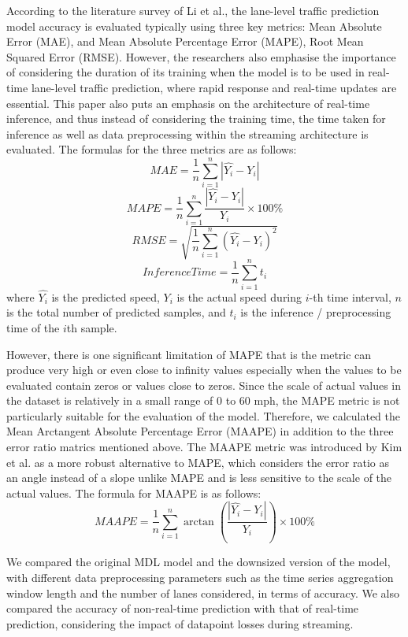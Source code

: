 \documentclass[11pt]{uonthesis}
\begin{document}
According to the literature survey of Li et al.\cite{li2024unifyinglaneleveltrafficprediction}, the lane-level traffic prediction model accuracy is evaluated typically using three key metrics: Mean Absolute Error (MAE), and Mean Absolute Percentage Error (MAPE), Root Mean Squared Error (RMSE). However, the researchers also emphasise the importance of considering the duration of its training when the model is to be used in real-time lane-level traffic prediction, where rapid response and real-time updates are essential. This paper also puts an emphasis on the architecture of real-time inference, and thus instead of considering the training time, the time taken for inference as well as data preprocessing within the streaming architecture is evaluated. The formulas for the three metrics are as follows:
\[ MAE = \frac{1}{n}\sum_{i=1}^{n}|\hat{Y_i} - Y_i| \]
\[ MAPE = \frac{1}{n}\sum_{i=1}^{n}\frac{|\hat{Y_i} - Y_i|}{Y_i} \times 100\% \]
\[ RMSE = \sqrt{\frac{1}{n}\sum_{i=1}^{n}(\hat{Y_i} - Y_i)^2} \]
\[ Inference Time = \frac{1}{n}\sum_{i=1}^{n}t_i \]
where $\hat{Y_i}$ is the predicted speed, $Y_i$ is the actual speed during $i$-th time interval, $n$ is the total number of predicted samples, and $t_i$ is the inference / preprocessing time of the $i$th sample.

However, there is one significant limitation of MAPE that is the metric can produce very high or even close to infinity values especially when the values to be evaluated contain zeros or values close to zeros. Since the scale of actual values in the dataset is relatively in a small range of 0 to 60 mph, the MAPE metric is not particularly suitable for the evaluation of the model. Therefore, we calculated the Mean Arctangent Absolute Percentage Error (MAAPE) in addition to the three error ratio matrics mentioned above. The MAAPE metric was introduced by Kim et al.\cite{KIM2016669} as a more robust alternative to MAPE, which considers the error ratio as an angle instead of a slope unlike MAPE and is less sensitive to the scale of the actual values. The formula for MAAPE is as follows:
\[ MAAPE = \frac{1}{n}\sum_{i=1}^{n} \arctan\left(\frac{|\hat{Y_i} - Y_i|}{Y_i}\right) \times 100\% \]


We compared the original MDL model and the downsized version of the model, with different data preprocessing parameters such as the time series aggregation window length and the number of lanes considered, in terms of accuracy. We also compared the accuracy of non-real-time prediction with that of real-time prediction, considering the impact of datapoint losses during streaming. 
\end{document}
